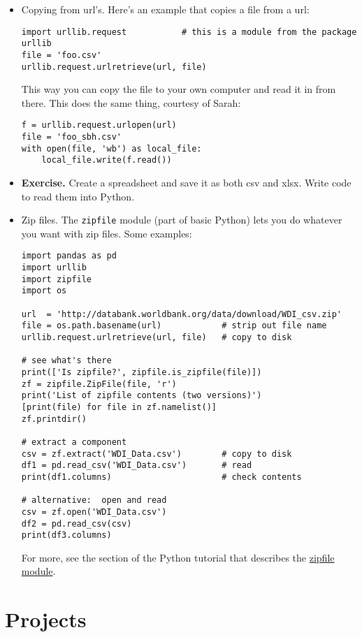 \documentclass[11pt]{article}
\begin{document}
\begin{itemize}
\item Copying from url's.
Here's an example that copies a file from a url:
\begin{verbatim}
import urllib.request           # this is a module from the package urllib
file = 'foo.csv'
urllib.request.urlretrieve(url, file)
\end{verbatim}
This way you can copy the file to your own computer and read it in from there.
This does the same thing, courtesy of Sarah:
\begin{verbatim}
f = urllib.request.urlopen(url)
file = 'foo_sbh.csv'
with open(file, 'wb') as local_file:
    local_file.write(f.read())
\end{verbatim}

\item {\bf Exercise.}  Create a spreadsheet and save it as both csv and xlsx.
Write code to read them into Python.


\item Zip files.  The {\tt zipfile} module (part of basic Python)
lets you do whatever you want with zip files.
Some examples:
\begin{verbatim}
import pandas as pd
import urllib
import zipfile
import os

url  = 'http://databank.worldbank.org/data/download/WDI_csv.zip'
file = os.path.basename(url)            # strip out file name
urllib.request.urlretrieve(url, file)   # copy to disk

# see what's there
print(['Is zipfile?', zipfile.is_zipfile(file)])
zf = zipfile.ZipFile(file, 'r')
print('List of zipfile contents (two versions)')
[print(file) for file in zf.namelist()]
zf.printdir()

# extract a component
csv = zf.extract('WDI_Data.csv')        # copy to disk
df1 = pd.read_csv('WDI_Data.csv')       # read
print(df1.columns)                      # check contents

# alternative:  open and read
csv = zf.open('WDI_Data.csv')
df2 = pd.read_csv(csv)
print(df3.columns)
\end{verbatim}
For more, see the section of the Python tutorial that describes the
\href{https://docs.python.org/3.4/library/zipfile.html#module-zipfile}{zipfile module}.

\end{itemize}

\section{Projects}
\end{document}
